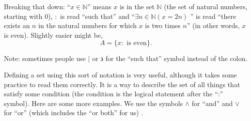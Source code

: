 \documentclass[10pt,]{book}
\theoremstyle{plain}
\theoremstyle{definition}
\theoremstyle{definition}
\theoremstyle{definition}
\numberwithin{equation}{section}
\def\N{\mathbb N}
\def\st{:}
\begin{document}
      Breaking that down: ``\(x \in \N\)'' means \(x\) is in the set \(\N\) \label{notation-1}
 (the set of natural numbers, starting with 0), \(:\) \label{notation-2}
      is read ``such that'' and ``\(\exists n\in \N (x = 2n) \)
      '' is read ``there exists an \(n\) in the natural numbers for which \(x\) is two times \(n\)'' (in other words, \(x\) is even). Slightly easier might be,
      \begin{equation*}
        A = \{x \st \mbox{  is even} \}.
      \end{equation*}
\par

      Note: sometimes people use \(|\) or \(\backepsilon\) for the ``such that'' symbol instead of the colon.
\par

      Defining a set using this sort of notation is very useful, although it takes some practice to read them correctly. It is a way to describe the set of all things that satisfy some condition (the condition is the logical statement after the ``:''      symbol). Here are some more examples. We use the symbols \(\wedge\) for ``and'' and \(\vee\) for ``or'' (which includes the ``or both'' for us)
      .
\end{document}
